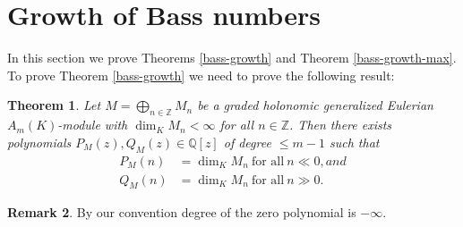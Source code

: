 \documentclass{amsart}
\newcommand{\ZZ}{\mathbb{Z} }
\theoremstyle{plain}
\newtheorem{theorem}{Theorem}[section]
\theoremstyle{definition}
\newtheorem{remark}[theorem]{Remark}
\theoremstyle{remark}
\begin{document}
\section{Growth of Bass numbers}
In this section we prove Theorems \ref{bass-growth} and Theorem \ref{bass-growth-max}. To prove Theorem \ref{bass-growth} we need to prove the following result:
\begin{theorem}
\label{GB-hol} Let $M = \bigoplus_{n \in \ZZ}M_n$ be a graded holonomic generalized Eulerian $A_m(K)$-module with $\dim_K M_n < \infty$ for all $n \in \ZZ$. Then there exists polynomials $P_M(z), Q_M(z)\in \mathbb{Q}[z]$  of degree $\leq m -1$ such that 
\begin{align*}
P_M(n) &= \dim_K M_n  \ \text{for all} \  n \ll 0, and \\
Q_M(n) &= \dim_K M_n  \ \text{for all} \  n \gg 0.
\end{align*}
\end{theorem}
\begin{remark}
By our convention degree of the zero polynomial is $-\infty$.
\end{remark}
\end{document}
